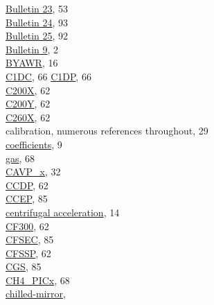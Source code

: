 \documentclass[
  english,
]{book}
\begin{document}
\href{./4-the-state-of-the-atmosphere.html\#wind}{Bulletin 23}, 53\\
\href{./5-cloud-physics-variables.html\#plwc}{Bulletin 24}, 93\\
\href{./10-obsolete-variables.html\#swtc}{Bulletin 25}, 92\\
\href{./4-the-state-of-the-atmosphere.html\#humidity}{Bulletin 9}, 2\\
\href{./3-the-state-of-the-aircraft.html\#byawr}{BYAWR}, 16\\
\href{./5-cloud-physics-variables.html\#c1dc-c1dp}{C1DC}, 66
\href{./5-cloud-physics-variables.html\#c1dc-c1dp}{C1DP}, 66\\
\href{./5-cloud-physics-variables.html\#size-distribution}{C200X}, 62\\
\href{./5-cloud-physics-variables.html\#size-distribution}{C200Y}, 62\\
\href{./5-cloud-physics-variables.html\#size-distribution}{C260X}, 62\\
calibration, numerous references throughout, 29\\
\hspace*{0.333em}\hspace*{0.333em}\href{./1-general-information-about-data-files.html\#background-information}{coefficients},
9\\
\hspace*{0.333em}\hspace*{0.333em}\href{./6-air-chemistry-measurements.html\#comr-al}{gas},
68\\
\href{./4-the-state-of-the-atmosphere.html\#p-special}{CAVP\_x}, 32\\
\href{./5-cloud-physics-variables.html\#size-distribution}{CCDP}, 62\\
\href{./10-obsolete-variables.html\#loranc}{CCEP}, 85\\
\href{./3-the-state-of-the-aircraft.html\#wp3}{centrifugal
acceleration}, 14\\
\href{./5-cloud-physics-variables.html\#size-distribution}{CF300}, 62\\
\href{./10-obsolete-variables.html\#loranc}{CFSEC}, 85\\
\href{./5-cloud-physics-variables.html\#size-distribution}{CFSSP}, 62\\
\href{./10-obsolete-variables.html\#loranc}{CGS}, 85\\
\href{./6-air-chemistry-measurements.html\#co2-pic}{CH4\_PICx}, 68\\
\href{./4-the-state-of-the-atmosphere.html\#dew-point}{chilled-mirror},
\end{document}
